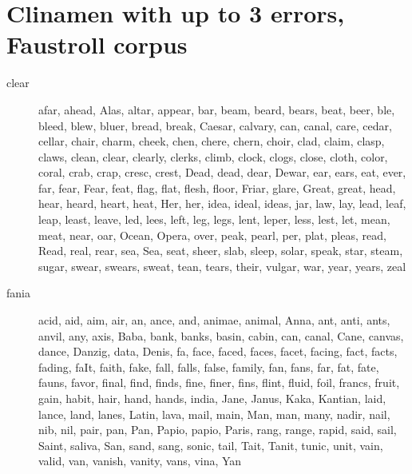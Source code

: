 \section{Clinamen with up to 3 errors, Faustroll corpus}
\label{app:clin3errors}

\begin{description}
  \item[clear] afar, ahead, Alas, altar, appear, bar, beam, beard, bears, beat, beer, ble, bleed, blew, bluer, bread, break, Caesar, calvary, can, canal, care, cedar, cellar, chair, charm, cheek, chen, chere, chern, choir, clad, claim, clasp, claws, clean, clear, clearly, clerks, climb, clock, clogs, close, cloth, color, coral, crab, crap, cresc, crest, Dead, dead, dear, Dewar, ear, ears, eat, ever, far, fear, Fear, feat, flag, flat, flesh, floor, Friar, glare, Great, great, head, hear, heard, heart, heat, Her, her, idea, ideal, ideas, jar, law, lay, lead, leaf, leap, least, leave, led, lees, left, leg, legs, lent, leper, less, lest, let, mean, meat, near, oar, Ocean, Opera, over, peak, pearl, per, plat, pleas, read, Read, real, rear, sea, Sea, seat, sheer, slab, sleep, solar, speak, star, steam, sugar, swear, swears, sweat, tean, tears, their, vulgar, war, year, years, zeal
  \item[fania] acid, aid, aim, air, an, ance, and, animae, animal, Anna, ant, anti, ants, anvil, any, axis, Baba, bank, banks, basin, cabin, can, canal, Cane, canvas, dance, Danzig, data, Denis, fa, face, faced, faces, facet, facing, fact, facts, fading, faIt, faith, fake, fall, falls, false, family, fan, fans, far, fat, fate, fauns, favor, final, find, finds, fine, finer, fins, flint, fluid, foil, francs, fruit, gain, habit, hair, hand, hands, india, Jane, Janus, Kaka, Kantian, laid, lance, land, lanes, Latin, lava, mail, main, Man, man, many, nadir, nail, nib, nil, pair, pan, Pan, Papio, papio, Paris, rang, range, rapid, said, sail, Saint, saliva, San, sand, sang, sonic, tail, Tait, Tanit, tunic, unit, vain, valid, van, vanish, vanity, vans, vina, Yan

\end{description}
